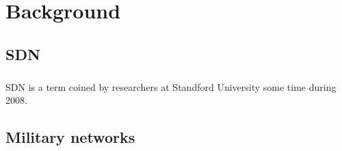 \chapter{Background}
\label{ch:background}
\section{SDN}
\paragraph{} \gls{SDN} is a term coined by researchers at Standford University some time during 2008.
\section{Military networks}